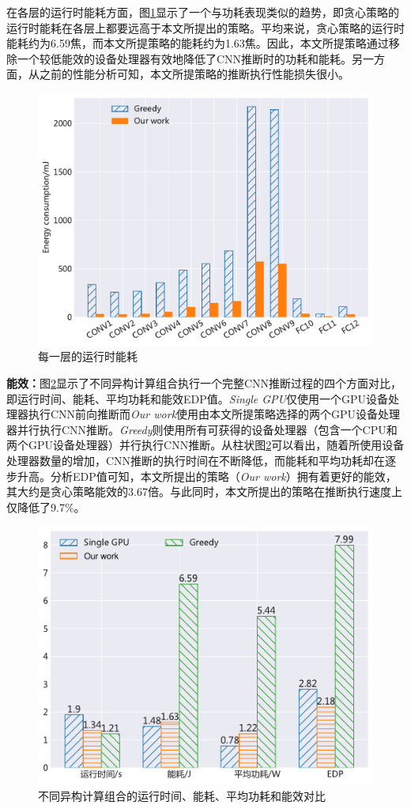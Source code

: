 在各层的运行时能耗方面，图\ref{figure:figure34}显示了一个与功耗表现类似的趋势，即贪心策略的运行时能耗在各层上都要远高于本文所提出的策略。平均来说，贪心策略的运行时能耗约为6.59焦，而本文所提策略的能耗约为1.63焦。因此，本文所提策略通过移除一个较低能效的设备处理器有效地降低了CNN推断时的功耗和能耗。另一方面，从之前的性能分析可知，本文所提策略的推断执行性能损失很小。

\begin{figure}[htbp]
    \centering
    \includegraphics[height=0.4\textwidth]{figures/hc_energy.pdf}
    \caption{每一层的运行时能耗}\label{figure:figure34}
\end{figure}

\textbf{能效：}图\ref{figure:figure35}显示了不同异构计算组合执行一个完整CNN推断过程的四个方面对比，即运行时间、能耗、平均功耗和能效EDP值。\emph{Single GPU}仅使用一个GPU设备处理器执行CNN前向推断而\emph{Our work}使用由本文所提策略选择的两个GPU设备处理器并行执行CNN推断。\emph{Greedy}则使用所有可获得的设备处理器（包含一个CPU和两个GPU设备处理器）并行执行CNN推断。从柱状图\ref{figure:figure35}可以看出，随着所使用设备处理器数量的增加，CNN推断的执行时间在不断降低，而能耗和平均功耗却在逐步升高。分析EDP值可知，本文所提出的策略（\emph{Our work}）拥有着更好的能效，其大约是贪心策略能效的3.67倍。与此同时，本文所提出的策略在推断执行速度上仅降低了9.7\%。

\begin{figure}[htbp]
    \centering
    \includegraphics[height=0.4\textwidth]{figures/hc_gpu.pdf}
    \caption{不同异构计算组合的运行时间、能耗、平均功耗和能效对比}\label{figure:figure35}
\end{figure}

